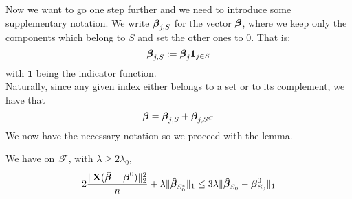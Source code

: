Now we want to go one step further and we need to introduce some supplementary notation. We write \(\boldsymbol{\beta}_{j,S}\) for the vector \(\boldsymbol{\beta}\), where we keep only the components which belong to \(S\) and set the other ones to 0. That is:
\[
    \boldsymbol{\beta}_{j,S} := \boldsymbol{\beta}_{j} \mathbf{1}_{j \in S}
\]
with \(\mathbf{1}\) being the indicator function. \\
Naturally, since any given index either belongs to a set or to its complement, we have that
\[
    \boldsymbol{\beta} = \boldsymbol{\beta}_{j,S} + \boldsymbol{\beta}_{j,S^C}
\]
We now have the necessary notation so we proceed with the lemma.
\begin{lemma} %
    \label{lemma: lemma 6.3.}
    We have on $\mathscr{T}$, with $\lambda \geq 2 \lambda_{0}$,
    \begin{equation*}
        2\frac{ \|\mathbf{X} (\boldsymbol{\hat{\beta}}-\boldsymbol{\beta}^{0} ) \|_{2}^{2}}{n} + \lambda \|\boldsymbol{\hat{\beta}}_{S_{0}^{c}} \|_{1} \leq 3 \lambda \|\boldsymbol{\hat{\beta}}_{S_{0}}-\boldsymbol{\beta}_{S_{0}}^{0} \|_{1}
    \end{equation*}
\end{lemma}
